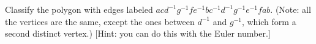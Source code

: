 Classify the polygon with edges labeled
$acd^{-1}g^{-1}fe^{-1}bc^{-1}d^{-1}g^{-1}e^{-1}fab.$ (Note: all the
vertices are the same, except the ones between $d^{-1}$ and $g^{-1}$,
which form a second distinct vertex.) [Hint: you can do this with
the Euler number.]

